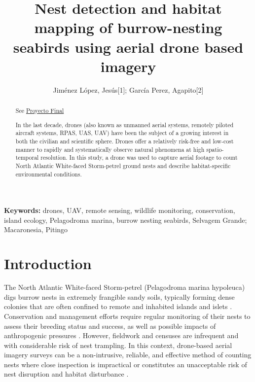 \documentclass[12pt]{article}
\begin{document}
\title{Nest detection and habitat mapping of burrow-nesting seabirds using aerial drone based imagery}

\author{Jiménez López, Jesús[1]; García Perez, Agapito[2]}


\maketitle
\begin{abstract}
	
See \href{https://github.com/jesusjl/proyecto\_final}{Proyecto Final}

In the last decade, drones (also known as unmanned aerial systems, remotely piloted aircraft systems, RPAS, UAS, UAV) have been the subject of a growing interest in both the civilian and scientific sphere. Drones offer a relatively risk-free and low-cost manner to rapidly and systematically observe natural phenomena at high spatio-temporal resolution. In this study, a drone was used to capture aerial footage to count North Atlantic White-faced Storm-petrel ground nests and describe habitat-specific environmental conditions.

\end{abstract}

{\bf Keywords:} drones, UAV, remote sensing, wildlife monitoring, conservation, island ecology, Pelagodroma marina, burrow nesting seabirds, Selvagem Grande; Macaronesia, Pitingo

\section{Introduction}

The North Atlantic White-faced Storm-petrel (Pelagodroma marina hypoleuca) digs burrow nests in extremely frangible sandy soils, typically forming dense colonies that are often confined to remote and inhabited islands and islets \cite{miguel_pessanha_pais_aquasig_2020}. Conservation and management efforts require regular monitoring of their nests to assess their breeding status and success, as well as possible impacts of anthropogenic pressures \cite{ferreira_bottom-up_2015}. However, fieldwork and censuses are infrequent and with considerable risk of nest trampling. In this context, drone-based aerial imagery surveys can be a non-intrusive, reliable, and effective method of counting nests where close inspection is impractical or constitutes an unacceptable risk of nest disruption and habitat disturbance \cite{ventura_mapping_2018}. 
\end{document}
